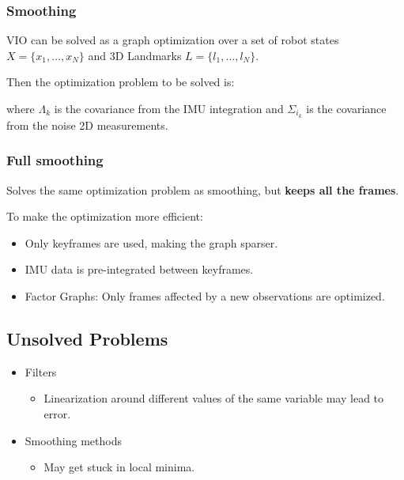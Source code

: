 \documentclass[10pt,a4paper]{scrartcl}
\begin{document}
\begin{multicols*}{2}
\subsubsection{Smoothing}

VIO can be solved as a graph optimization over a set of robot states $X=\{x_1,\ldots,x_N\}$ and 3D Landmarks $L =\{l_1,\ldots,l_N\}$.



Then the optimization problem to be solved is:


where $\Lambda_k$ is the covariance from the IMU integration and $\Sigma_{i_k}$ is the covariance from the noise 2D measurements.

\subsubsection{Full smoothing}

Solves the same optimization problem as smoothing, but \textbf{keeps all the frames}.

To make the optimization more efficient:

\begin{itemize}
\item Only keyframes are used, making the graph sparser.
\item IMU data is pre-integrated between keyframes.
\item Factor Graphs: Only frames affected by a new observations are optimized.
\end{itemize}

\subsection{Unsolved Problems}

\begin{itemize}
\item Filters
\begin{itemize}
\item Linearization around different values of the same variable may lead to error.
\end{itemize}
\item Smoothing methods
\begin{itemize}
\item May get stuck in local minima.
\end{itemize}
\end{itemize}


\end{multicols*}
\end{document}
